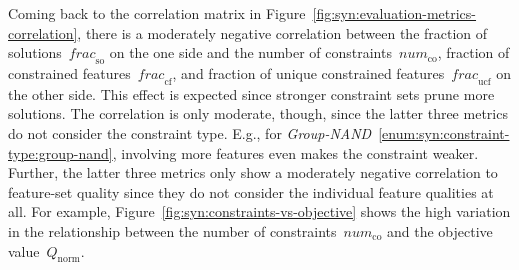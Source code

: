Coming back to the correlation matrix in Figure~\ref{fig:syn:evaluation-metrics-correlation},
there is a moderately negative correlation between the fraction of solutions~$\mathit{frac}_{\text{so}}$ on the one side and the number of constraints~$\mathit{num}_{\text{co}}$, fraction of constrained features~$\mathit{frac}_{\text{cf}}$, and fraction of unique constrained features~$\mathit{frac}_{\text{ucf}}$ on the other side.
This effect is expected since stronger constraint sets prune more solutions.
The correlation is only moderate, though, since the latter three metrics do not consider the constraint type.
E.g., for \emph{Group-NAND}~\ref{enum:syn:constraint-type:group-nand}, involving more features even makes the constraint weaker.
Further, the latter three metrics only show a moderately negative correlation to feature-set quality since they do not consider the individual feature qualities at all.
For example, Figure~\ref{fig:syn:constraints-vs-objective} shows the high variation in the relationship between the number of constraints~$\mathit{num}_{\text{co}}$ and the objective value~$Q_{\text{norm}}$.

